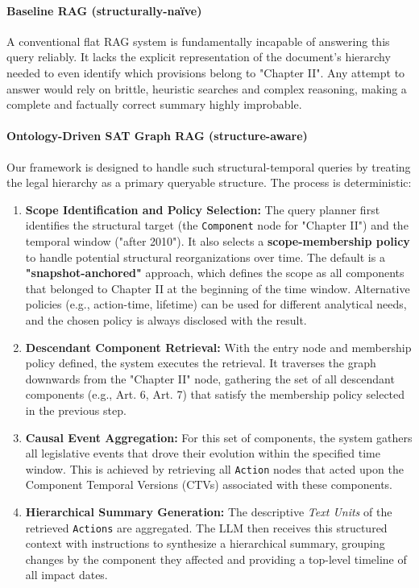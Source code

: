 \documentclass[11pt]{article}
\begin{document}
\paragraph{Baseline RAG (structurally-naïve)} A conventional flat RAG system is fundamentally incapable of answering this query reliably. It lacks the explicit representation of the document's hierarchy needed to even identify which provisions belong to "Chapter II". Any attempt to answer would rely on brittle, heuristic searches and complex reasoning, making a complete and factually correct summary highly improbable.

\paragraph{Ontology-Driven SAT Graph RAG (structure-aware)}
Our framework is designed to handle such structural-temporal queries by treating the legal hierarchy as a primary queryable structure. The process is deterministic:

\begin{enumerate}
    \item \textbf{Scope Identification and Policy Selection:} The query planner first identifies the structural target (the \texttt{Component} node for "Chapter II") and the temporal window ("after 2010"). It also selects a \textbf{scope-membership policy} to handle potential structural reorganizations over time. The default is a \textbf{"snapshot-anchored"} approach, which defines the scope as all components that belonged to Chapter II at the beginning of the time window. Alternative policies (e.g., action-time, lifetime) can be used for different analytical needs, and the chosen policy is always disclosed with the result.

    \item \textbf{Descendant Component Retrieval:} With the entry node and membership policy defined, the system executes the retrieval. It traverses the graph downwards from the "Chapter II" node, gathering the set of all descendant components (e.g., Art. 6, Art. 7) that satisfy the membership policy selected in the previous step.

    \item \textbf{Causal Event Aggregation:} For this set of components, the system gathers all legislative events that drove their evolution within the specified time window. This is achieved by retrieving all \texttt{Action} nodes that acted upon the Component Temporal Versions (CTVs) associated with these components.

  \item \textbf{Hierarchical Summary Generation:} The descriptive \textit{Text Units} of the retrieved \texttt{Actions} are aggregated. The LLM then receives this structured context with instructions to synthesize a hierarchical summary, grouping changes by the component they affected and providing a top-level timeline of all impact dates.
\end{enumerate}
\end{document}
